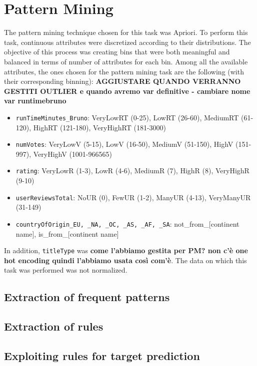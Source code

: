 \chapter{Pattern Mining}
\label{ch:capitolo2}
The pattern mining technique chosen for this task was Apriori.
To perform this task, continuous attributes were discretized according to
their distributions. The objective of this process was creating bins that were both meaningful
and balanced in terms of number of attributes for each bin.
Among all the available attributes, the ones chosen for the pattern mining task are the following (with their corresponding binning):
\textbf{AGGIUSTARE QUANDO VERRANNO GESTITI OUTLIER e quando avremo var definitive - cambiare nome var runtimebruno}
\begin{itemize}
    \item \texttt{runTimeMinutes\_Bruno}: VeryLowRT (0-25), LowRT (26-60), MediumRT (61-120), HighRT (121-180), VeryHighRT (181-3000)
    \item \texttt{numVotes}: VeryLowV (5-15), LowV (16-50), MediumV (51-150), HighV (151-997), VeryHighV (1001-966565)
    \item \texttt{rating}: VeryLowR (1-3), LowR (4-6), MediumR (7), HighR (8), VeryHighR (9-10)
    \item \texttt{userReviewsTotal}: NoUR (0), FewUR (1-2), ManyUR (4-13), VeryManyUR (31-149)
    \item \texttt{countryOfOrigin\_EU, \_NA, \_OC, \_AS, \_AF, \_SA}: not\_from\_[continent name], is\_from\_[continent name]
\end{itemize}
In addition, \texttt{titleType} was \textbf{come l'abbiamo gestita per PM? non c'è one hot encoding quindi l'abbiamo usata così com'è}.
The data on which this task was performed was not normalized.


\section{Extraction of frequent patterns}\label{sec:freq_patterns}


\section{Extraction of rules}\label{sec:rules}



\section{Exploiting rules for target prediction}\label{sec:prediction_rules}
